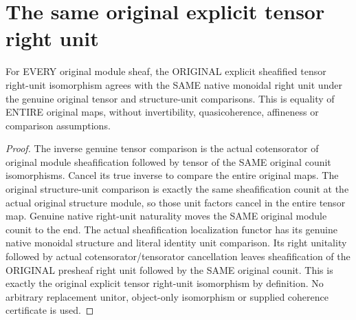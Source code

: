 \section{The same original explicit tensor right unit}

\begin{theorem}\label{sc0-tensor-obj-units:whole-right-unit}
\leanok
{}
For EVERY original module sheaf, the ORIGINAL explicit sheafified tensor right-unit isomorphism agrees with the SAME native monoidal right unit under the genuine original tensor and structure-unit comparisons. This is equality of ENTIRE original maps, without invertibility, quasicoherence, affineness or comparison assumptions.
\end{theorem}
\begin{proof}
The inverse genuine tensor comparison is the actual cotensorator of original module sheafification followed by tensor of the SAME original counit isomorphisms. Cancel its true inverse to compare the entire original maps. The original structure-unit comparison is exactly the same sheafification counit at the actual original structure module, so those unit factors cancel in the entire tensor map. Genuine native right-unit naturality moves the SAME original module counit to the end. The actual sheafification localization functor has its genuine native monoidal structure and literal identity unit comparison. Its right unitality followed by actual cotensorator/tensorator cancellation leaves sheafification of the ORIGINAL presheaf right unit followed by the SAME original counit. This is exactly the original explicit tensor right-unit isomorphism by definition. No arbitrary replacement unitor, object-only isomorphism or supplied coherence certificate is used.
\end{proof}
